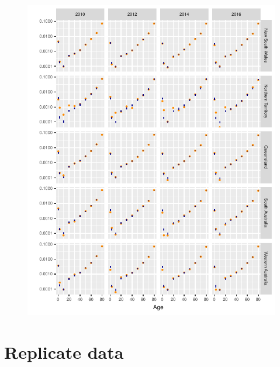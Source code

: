 \documentclass{article}
\begin{document}
\begin{figure}
  \centering
  \includegraphics{out/fig_rates_modelled_Male_Non-Indigenous_Baseline}
\end{figure}
\newpage

\clearpage
\section{Replicate data}
\newpage
\end{document}
